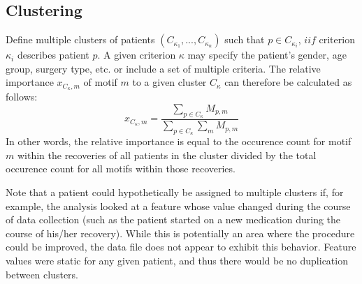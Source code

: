 \subsection{Clustering}
Define multiple clusters of patients $\left(C_{\kappa_1},...,C_{\kappa_n}\right)$ such that $p \in C_{\kappa_i}$, $iif$ criterion $\kappa_i$ describes patient $p$. A given criterion $\kappa$ may specify the patient's gender, age group, surgery type, etc. or include a set of multiple criteria. The relative importance $x_{C_{\kappa},m}$ of motif $m$ to a given cluster $C_{\kappa}$ can therefore be calculated as follows:
\begin{equation}\label{eqn:motif_importance}
    x_{C_\kappa,m} = \frac{\sum\limits_{p \in C_\kappa} M_{p,m}}{\sum\limits_{p \in C_\kappa} \sum\limits_{m} M_{p,m}}
\end{equation}
In other words, the relative importance is equal to the occurence count for motif $m$ within the recoveries of all patients in the cluster divided by the total occurence count for all motifs within those recoveries.

Note that a patient could hypothetically be assigned to multiple clusters if, for example, the analysis looked at a feature whose value changed during the course of data collection (such as the patient started on a new medication during the course of his/her recovery). While this is potentially an area where the procedure could be improved, the data file does not appear to exhibit this behavior. Feature values were static for any given patient, and thus there would be no duplication between clusters.